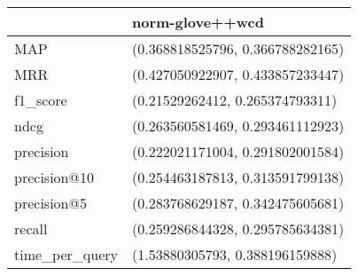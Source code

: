 \begin{tabular}{ll}
\toprule
{} &                   norm-glove++wcd \\
\midrule
MAP            &  (0.368818525796, 0.366788282165) \\
MRR            &  (0.427050922907, 0.433857233447) \\
f1\_score       &   (0.21529262412, 0.265374793311) \\
ndcg           &  (0.263560581469, 0.293461112923) \\
precision      &  (0.222021171004, 0.291802001584) \\
precision@10   &  (0.254463187813, 0.313591799138) \\
precision@5    &  (0.283768629187, 0.342475605681) \\
recall         &  (0.259286844328, 0.295785634381) \\
time\_per\_query &   (1.53880305793, 0.388196159888) \\
\bottomrule
\end{tabular}
